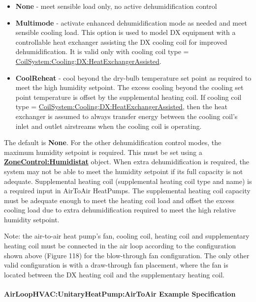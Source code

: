 \begin{itemize}
\item
  \textbf{None} - meet sensible load only, no active dehumidification control
\item
  \textbf{Multimode} - activate enhanced dehumidification mode as needed and meet sensible cooling load. This option is used to model DX equipment with a controllable heat exchanger assisting the DX cooling coil for improved dehumidification. It is valid only with cooling coil type = \hyperref[coilsystemcoolingdxheatexchangerassisted]{CoilSystem:Cooling:DX:HeatExchangerAssisted}.
\item
  \textbf{CoolReheat} - cool beyond the dry-bulb temperature set point as required to meet the high humidity setpoint. The excess cooling beyond the cooling set point temperature is offset by the supplemental heating coil. If cooling coil type = \hyperref[coilsystemcoolingdxheatexchangerassisted]{CoilSystem:Cooling:DX:HeatExchangerAssisted}, then the heat exchanger is assumed to always transfer energy between the cooling coil's inlet and outlet airstreams when the cooling coil is operating.
\end{itemize}

The default is \textbf{None}. For the other dehumidification control modes, the maximum humidity setpoint is required. This must be set using a \textbf{\hyperref[zonecontrolhumidistat]{ZoneControl:Humidistat}} object. When extra dehumidification is required, the system may not be able to meet the humidity setpoint if its full capacity is not adequate. Supplemental heating coil (supplemental heating coil type and name) is a required input in AirToAir HeatPumps. The supplemental heating coil capacity must be adequate enough to meet the heating coil load and offset the excess cooling load due to extra dehumidification required to meet the high relative humidity setpoint.

Note: the air-to-air heat pump's fan, cooling coil, heating coil and supplementary heating coil must be connected in the air loop according to the configuration shown above (Figure 118) for the blow-through fan configuration. The only other valid configuration is with a draw-through fan placement, where the fan is located between the DX heating coil and the supplementary heating coil.

\paragraph{AirLoopHVAC:UnitaryHeatPump:AirToAir Example Specification}\label{airloophvacunitaryheatpumpairtoair-example-specification}

